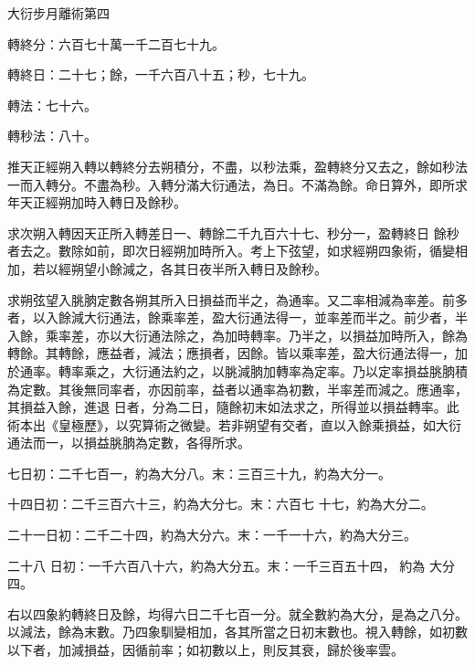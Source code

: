 \begin{pinyinscope}
 大衍步月離術第四



 轉終分：六百七十萬一千二百七十九。



 轉終日：二十七；餘，一千六百八十五；秒，七十九。



 轉法：七十六。



 轉秒法：八十。



 推天正經朔入轉以轉終分去朔積分，不盡，以秒法乘，盈轉終分又去之，餘如秒法一而入轉分。不盡為秒。入轉分滿大衍通法，為日。不滿為餘。命日算外，即所求年天正經朔加時入轉日及餘秒。



 求次朔入轉因天正所入轉差日一、轉餘二千九百六十七、秒分一，盈轉終日
 餘秒者去之。數除如前，即次日經朔加時所入。考上下弦望，如求經朔四象術，循變相加，若以經朔望小餘減之，各其日夜半所入轉日及餘秒。



 求朔弦望入朓朒定數各朔其所入日損益而半之，為通率。又二率相減為率差。前多者，以入餘減大衍通法，餘乘率差，盈大衍通法得一，並率差而半之。前少者，半入餘，乘率差，亦以大衍通法除之，為加時轉率。乃半之，以損益加時所入，餘為轉餘。其轉餘，應益者，減法；應損者，因餘。皆以乘率差，盈大衍通法得一，加於通率。轉率乘之，大衍通法約之，以朓減朒加轉率為定率。乃以定率損益朓朒積為定數。其後無同率者，亦因前率，益者以通率為初數，半率差而減之。應通率，其損益入餘，進退
 日者，分為二日，隨餘初末如法求之，所得並以損益轉率。此術本出《皇極歷》，以究算術之微變。若非朔望有交者，直以入餘乘損益，如大衍通法而一，以損益朓朒為定數，各得所求。



 七日初：二千七百一，約為大分八。末：三百三十九，約為大分一。



 十四日初：二千三百六十三，約為大分七。末：六百七
 十七，約為大分二。



 二十一日初：二千二十四，約為大分六。末：一千一十六，約為大分三。



 二十八
 日初：一千六百八十六，約為大分五。末：一千三百五十四，
 約為
 大分四。



 右以四象約轉終日及餘，均得六日二千七百一分。就全數約為大分，是為之八分。以減法，餘為末數。乃四象馴變相加，各其所當之日初末數也。視入轉餘，如初數以下者，加減損益，因循前率；如初數以上，則反其衰，歸於後率雲。




\end{pinyinscope}
